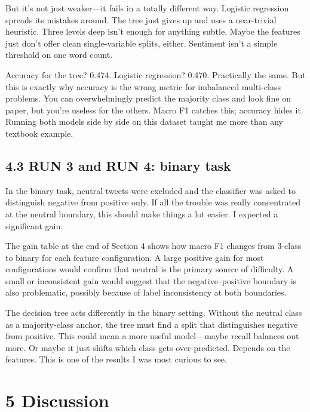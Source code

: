 \documentclass[12pt]{article}
\begin{document}
But it's not just weaker---it fails in a totally different way. Logistic regression spreads its mistakes around. The tree just gives up and uses a near-trivial heuristic. Three levels deep isn't enough for anything subtle. Maybe the features just don't offer clean single-variable splits, either. Sentiment isn't a simple threshold on one word count.

Accuracy for the tree? 0.474. Logistic regression? 0.470. Practically the same. But this is exactly why accuracy is the wrong metric for imbalanced multi-class problems. You can overwhelmingly predict the majority class and look fine on paper, but you're useless for the others. Macro F1 catches this; accuracy hides it. Running both models side by side on this dataset taught me more than any textbook example.



\subsection*{4.3 RUN 3 and RUN 4: binary task}



In the binary task, neutral tweets were excluded and the classifier was asked to distinguish negative from positive only. If all the trouble was really concentrated at the neutral boundary, this should make things a lot easier. I expected a significant gain.

The gain table at the end of Section 4 shows how macro F1 changes from 3-class to binary for each feature configuration. A large positive gain for most configurations would confirm that neutral is the primary source of difficulty. A small or inconsistent gain would suggest that the negative--positive boundary is also problematic, possibly because of label inconsistency at both boundaries.

The decision tree acts differently in the binary setting. Without the neutral class as a majority-class anchor, the tree must find a split that distinguishes negative from positive. This could mean a more useful model---maybe recall balances out more. Or maybe it just shifts which class gets over-predicted. Depends on the features. This is one of the results I was most curious to see.



\section*{5 Discussion}
\end{document}
